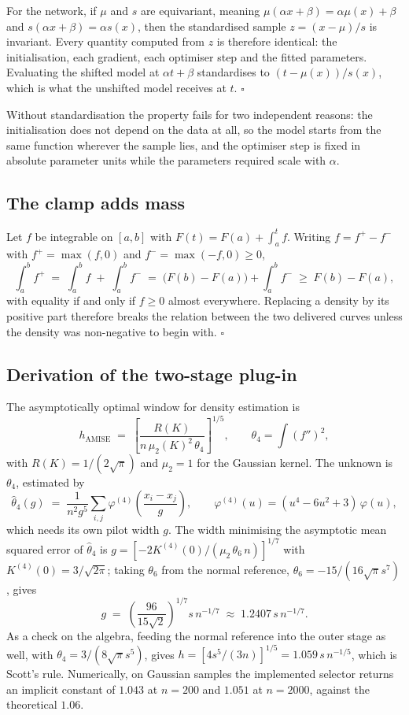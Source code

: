 \documentclass[11pt]{article}
\begin{document}
For the network, if $\mu$ and $s$ are equivariant, meaning $\mu(\alpha x + \beta) = \alpha
\mu(x) + \beta$ and $s(\alpha x + \beta) = \alpha s(x)$, then the standardised sample
$z = (x - \mu)/s$ is invariant. Every quantity computed from $z$ is therefore identical:
the initialisation, each gradient, each optimiser step and the fitted parameters. Evaluating
the shifted model at $\alpha t + \beta$ standardises to $(t - \mu(x))/s(x)$, which is what
the unshifted model receives at $t$. \hfill$\square$

Without standardisation the property fails for two independent reasons: the initialisation
does not depend on the data at all, so the model starts from the same function wherever the
sample lies, and the optimiser step is fixed in absolute parameter units while the parameters
required scale with $\alpha$.

\subsection*{The clamp adds mass}

Let $f$ be integrable on $[a,b]$ with $F(t) = F(a) + \int_a^t f$. Writing $f = f^+ - f^-$ with
$f^+ = \max(f, 0)$ and $f^- = \max(-f, 0) \ge 0$,
\[
\int_a^b f^+ \;=\; \int_a^b f \;+\; \int_a^b f^- \;=\; \big(F(b) - F(a)\big) + \int_a^b f^-
\;\ge\; F(b) - F(a),
\]
with equality if and only if $f \ge 0$ almost everywhere. Replacing a density by its positive
part therefore breaks the relation between the two delivered curves unless the density was
non-negative to begin with. \hfill$\square$

\subsection*{Derivation of the two-stage plug-in}

The asymptotically optimal window for density estimation is
\[
h_{\mathrm{AMISE}} \;=\; \left[ \frac{R(K)}{n\, \mu_2(K)^2\, \theta_4} \right]^{1/5},
\qquad \theta_4 = \int (f'')^2 ,
\]
with $R(K) = 1/(2\sqrt\pi)$ and $\mu_2 = 1$ for the Gaussian kernel. The unknown is
$\theta_4$, estimated by
\[
\hat\theta_4(g) \;=\; \frac{1}{n^2 g^5} \sum_{i,j} \varphi^{(4)}\!\left(\frac{x_i - x_j}{g}\right),
\qquad \varphi^{(4)}(u) = (u^4 - 6u^2 + 3)\,\varphi(u),
\]
which needs its own pilot width $g$. The width minimising the asymptotic mean squared error of
$\hat\theta_4$ is $g = [-2 K^{(4)}(0) / (\mu_2\, \theta_6\, n)]^{1/7}$ with $K^{(4)}(0) =
3/\sqrt{2\pi}$; taking $\theta_6$ from the normal reference, $\theta_6 = -15/(16\sqrt\pi
s^7)$, gives
\[
g \;=\; \left(\frac{96}{15\sqrt 2}\right)^{1/7} s\, n^{-1/7} \;\approx\; 1.2407\, s\, n^{-1/7}.
\]
As a check on the algebra, feeding the normal reference into the outer stage as well, with
$\theta_4 = 3/(8\sqrt\pi s^5)$, gives $h = [4 s^5/(3n)]^{1/5} = 1.059\, s\, n^{-1/5}$, which
is Scott's rule. Numerically, on Gaussian samples the implemented selector returns an implicit
constant of $1.043$ at $n = 200$ and $1.051$ at $n = 2000$, against the theoretical $1.06$.
\end{document}
